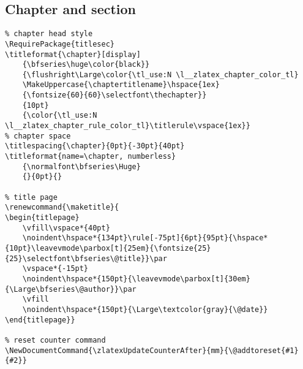 \subsection{Chapter and section}
\begin{verbatim}
% chapter head style
\RequirePackage{titlesec}
\titleformat{\chapter}[display]
    {\bfseries\huge\color{black}}
    {\flushright\Large\color{\tl_use:N \l__zlatex_chapter_color_tl}
    \MakeUppercase{\chaptertitlename}\hspace{1ex}
    {\fontsize{60}{60}\selectfont\thechapter}}
    {10pt}
    {\color{\tl_use:N \l__zlatex_chapter_rule_color_tl}\titlerule\vspace{1ex}}
% chapter space
\titlespacing{\chapter}{0pt}{-30pt}{40pt}
\titleformat{name=\chapter, numberless}
    {\normalfont\bfseries\Huge}
    {}{0pt}{}

% title page
\renewcommand{\maketitle}{
\begin{titlepage}
    \vfill\vspace*{40pt}
    \noindent\hspace*{134pt}\rule[-75pt]{6pt}{95pt}{\hspace*{10pt}\leavevmode\parbox[t]{25em}{\fontsize{25}{25}\selectfont\bfseries\@title}}\par
    \vspace*{-15pt}
    \noindent\hspace*{150pt}{\leavevmode\parbox[t]{30em}{\Large\bfseries\@author}}\par
    \vfill
    \noindent\hspace*{150pt}{\Large\textcolor{gray}{\@date}}
\end{titlepage}} 

% reset counter command
\NewDocumentCommand{\zlatexUpdateCounterAfter}{mm}{\@addtoreset{#1}{#2}}
\end{verbatim}